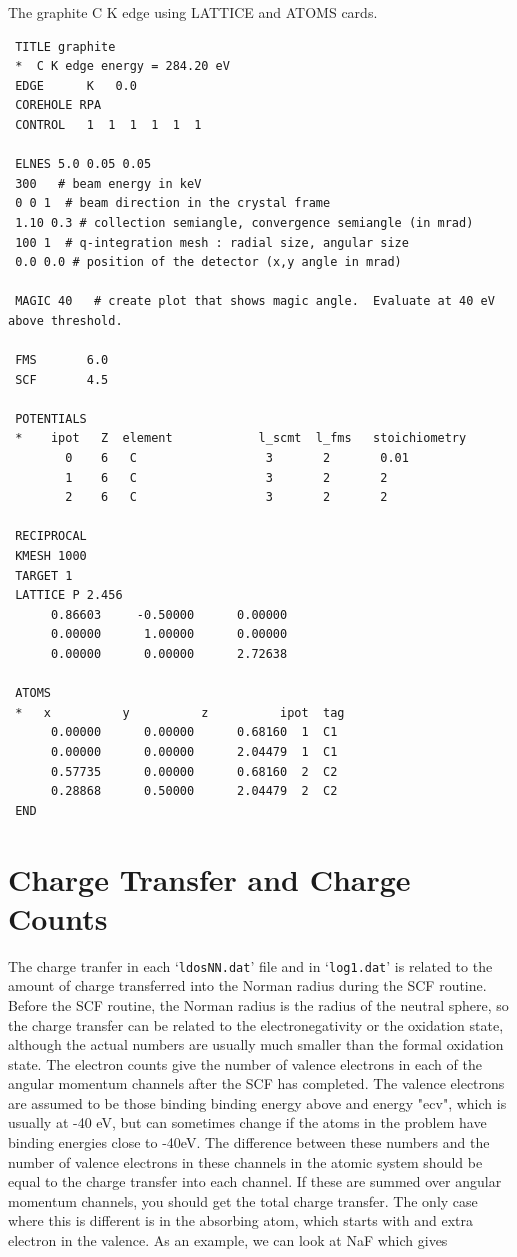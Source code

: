 \documentclass[11pt,oneside]{report} %
\newcommand{\file}[1]{`\texttt{#1}'}
\begin{document}
The graphite C K edge using LATTICE and ATOMS cards.

\begin{verbatim}
 TITLE graphite
 *  C K edge energy = 284.20 eV
 EDGE      K   0.0
 COREHOLE RPA
 CONTROL   1  1  1  1  1  1
 
 ELNES 5.0 0.05 0.05
 300   # beam energy in keV
 0 0 1  # beam direction in the crystal frame
 1.10 0.3 # collection semiangle, convergence semiangle (in mrad)
 100 1  # q-integration mesh : radial size, angular size
 0.0 0.0 # position of the detector (x,y angle in mrad)

 MAGIC 40   # create plot that shows magic angle.  Evaluate at 40 eV above threshold.

 FMS       6.0
 SCF       4.5

 POTENTIALS
 *    ipot   Z  element            l_scmt  l_fms   stoichiometry
        0    6   C                  3       2       0.01
        1    6   C                  3       2       2
        2    6   C                  3       2       2

 RECIPROCAL
 KMESH 1000
 TARGET 1
 LATTICE P 2.456
      0.86603     -0.50000      0.00000
      0.00000      1.00000      0.00000
      0.00000      0.00000      2.72638
 
 ATOMS
 *   x          y          z          ipot  tag           
      0.00000      0.00000      0.68160  1  C1
      0.00000      0.00000      2.04479  1  C1
      0.57735      0.00000      0.68160  2  C2
      0.28868      0.50000      2.04479  2  C2
 END
\end{verbatim}




\section{Charge Transfer and Charge Counts}
\label{sec:ChargeTransfer}

The charge tranfer in each \file{ldosNN.dat} file and in \file{log1.dat} is related to the amount of charge transferred into the Norman radius during the SCF routine. Before the SCF routine, the Norman radius is the radius of the neutral sphere, so the charge transfer can be related to the electronegativity or the oxidation state, although the actual numbers are usually much smaller than the formal oxidation state. The electron counts give the number of valence electrons in each of the angular momentum channels after the SCF has completed. The valence electrons are assumed to be those binding binding energy above and energy "ecv", which is usually at -40 eV, but can sometimes change if the atoms in the problem have binding energies close to -40eV. The difference between these numbers and the number of valence electrons in these channels in the atomic system should be equal to the charge transfer into each channel. If these are summed over angular momentum channels, you should get the total charge transfer. The only case where this is different is in the absorbing atom, which starts with and extra electron in the valence. As an example, we can look at NaF which gives
\end{document}
